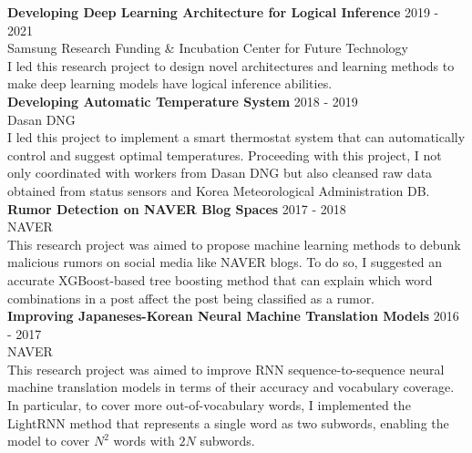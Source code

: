 \documentclass[12pt]{article}
\begin{document}
\noindent
{\bfseries Developing Deep Learning Architecture for Logical Inference} \hfill 2019 - 2021\\ 
\noindent 
Samsung Research Funding \& Incubation Center for Future Technology \\
I led this research project to design novel architectures and learning methods to make deep learning models have logical inference abilities.
\\ 

\noindent
{\bfseries Developing Automatic Temperature System} \hfill 2018 - 2019 \\ 
\noindent 
Dasan DNG\\
I led this project to implement a smart thermostat system that can automatically control and suggest optimal temperatures.
Proceeding with this project, I not only coordinated with workers from Dasan DNG but also cleansed raw data obtained from status sensors and Korea Meteorological Administration DB.\\

\noindent
{\bfseries Rumor Detection on NAVER Blog Spaces} \hfill 2017 - 2018 \\ 
\noindent 
NAVER\\
This research project was aimed to propose machine learning methods to debunk malicious rumors on social media like NAVER blogs. 
To do so, I suggested an accurate XGBoost-based tree boosting method that can explain which word combinations in a post affect the post being classified as a rumor.\\

\noindent
{\bfseries Improving Japaneses-Korean Neural Machine Translation Models} \hfill 2016 - 2017 \\ 
\noindent 
NAVER \\ 
This research project was aimed to improve RNN sequence-to-sequence neural machine translation models in terms of their accuracy and vocabulary coverage.
In particular, to cover more out-of-vocabulary words, I implemented the LightRNN method that represents a single word as two subwords, enabling the model to cover $N^2$ words with $2N$ subwords.
\vspace{0.2in} %
\end{document}
